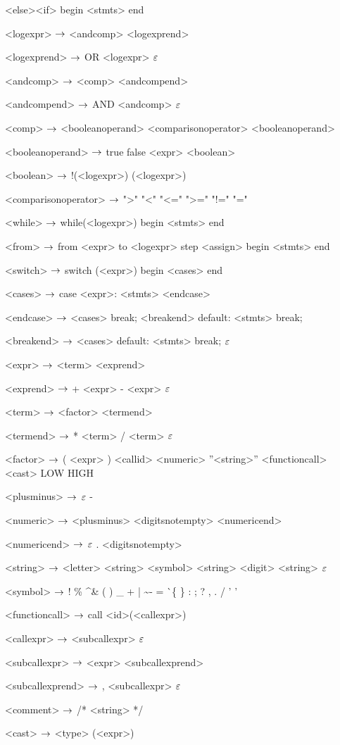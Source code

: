 \begin{grammar}
<else><if>
	\alt 
	begin
		<stmts>
	end
	 
<logexpr> $\rightarrow$ <andcomp> <logexprend>

<logexprend> $\rightarrow$ OR <logexpr>
\alt $\varepsilon$

<andcomp> $\rightarrow$ <comp> <andcompend>

<andcompend> $\rightarrow$ AND <andcomp>
\alt $\varepsilon$

<comp> $\rightarrow$ <booleanoperand> <comparisonoperator> <booleanoperand>

<booleanoperand> $\rightarrow$ true
		\alt false
		\alt <boolean>

<boolean> $\rightarrow$ !(<logexpr>)
		\alt (<logexpr>)

<comparisonoperator> $\rightarrow$ ">"
				\alt "<"
				\alt "<="
				\alt ">="
				\alt "!="
				\alt "="

<while> $\rightarrow$ while(<logexpr>)
		begin
			<stmts>
		end
		
<from> $\rightarrow$ from <expr> to <logexpr> step <assign>
	begin
		<stmts>
	end

<switch> $\rightarrow$ switch (<expr>)
		begin
			<cases>
		end

<cases> $\rightarrow$ case <expr>:
			<stmts>
		<endcase>
		
<endcase> $\rightarrow$ <cases>
		\alt break; <breakend>
		\alt default:
			<stmts>
			break;

<breakend> $\rightarrow$ <cases>
\alt default:
<stmts>
break;
\alt $\varepsilon$

<expr> $\rightarrow$ <term> <exprend>

<exprend> $\rightarrow$ + <expr>
\alt - <expr>
\alt $\varepsilon$

<term> $\rightarrow$ <factor> <termend>

<termend> $\rightarrow$ * <term>
\alt / <term>
\alt $\varepsilon$

<factor> $\rightarrow$ ( <expr> )
	\alt <callid>
	\alt <numeric>
	\alt ''<string>''
	\alt <functioncall> 
	\alt <cast>
	\alt LOW
	\alt HIGH

<plusminus> $\rightarrow$ $\varepsilon$
	\alt -

<numeric> $\rightarrow$ <plusminus> <digitsnotempty> <numericend>

<numericend> $\rightarrow$ $\varepsilon$
\alt . <digitsnotempty>

<string> $\rightarrow$ <letter> <string>
\alt <symbol> <string>
\alt <digit> <string>
\alt $\varepsilon$

<symbol> $\rightarrow$ !
\alt \%
\alt \^
\alt \&
\alt *
\alt (
\alt )
\alt \_
\alt +
\alt |
\alt \~
\alt -
\alt =
\alt \`
\alt \{
\alt \}
\alt [
\alt ]
\alt :
\alt ;
\alt ?
\alt ,
\alt .
\alt /
\alt ' '

<functioncall> $\rightarrow$ call <id>(<callexpr>)

<callexpr> $\rightarrow$ <subcallexpr>
\alt $\varepsilon$

<subcallexpr> $\rightarrow$ <expr> <subcallexprend>

<subcallexprend> $\rightarrow$ , <subcallexpr>
\alt $\varepsilon$

<comment> $\rightarrow$ /* <string> */

<cast> $\rightarrow$ <type> (<expr>)

\end{grammar}
